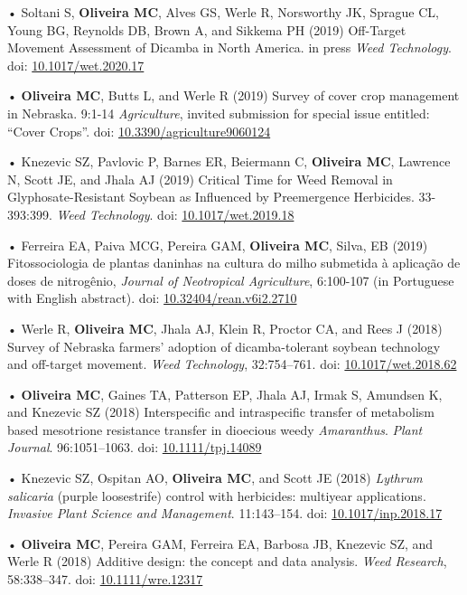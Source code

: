 \documentclass[11pt,]{article}
\begin{document}
• Soltani S, \textbf{Oliveira MC}, Alves GS, Werle R, Norsworthy JK,
Sprague CL, Young BG, Reynolds DB, Brown A, and Sikkema PH (2019)
Off-Target Movement Assessment of Dicamba in North America. in press
\emph{Weed Technology}. doi:
\href{https://doi.org/10.1017/wet.2020.17}{10.1017/wet.2020.17}

• \textbf{Oliveira MC}, Butts L, and Werle R (2019) Survey of cover crop
management in Nebraska. 9:1-14 \emph{Agriculture}, invited submission
for special issue entitled: ``Cover Crops''. doi:
\href{https://doi.org/10.3390/agriculture9060124}{10.3390/agriculture9060124}

• Knezevic SZ, Pavlovic P, Barnes ER, Beiermann C, \textbf{Oliveira MC},
Lawrence N, Scott JE, and Jhala AJ (2019) Critical Time for Weed Removal
in Glyphosate-Resistant Soybean as Influenced by Preemergence
Herbicides. 33-393:399. \emph{Weed Technology}. doi:
\href{https://doi.org/10.1017/wet.2019.18}{10.1017/wet.2019.18}

• Ferreira EA, Paiva MCG, Pereira GAM, \textbf{Oliveira MC}, Silva, EB
(2019) Fitossociologia de plantas daninhas na cultura do milho submetida
à aplicação de doses de nitrogênio, \emph{Journal of Neotropical
Agriculture}, 6:100-107 (in Portuguese with English abstract). doi:
\href{https://doi.org/10.32404/rean.v6i2.2710}{10.32404/rean.v6i2.2710}

• Werle R, \textbf{Oliveira MC}, Jhala AJ, Klein R, Proctor CA, and Rees
J (2018) Survey of Nebraska farmers' adoption of dicamba-tolerant
soybean technology and off-target movement. \emph{Weed Technology},
32:754--761. doi:
\href{https://doi.org/10.1017/wet.2018.62}{10.1017/wet.2018.62}

• \textbf{Oliveira MC}, Gaines TA, Patterson EP, Jhala AJ, Irmak S,
Amundsen K, and Knezevic SZ (2018) Interspecific and intraspecific
transfer of metabolism based mesotrione resistance transfer in dioecious
weedy \emph{Amaranthus}. \emph{Plant Journal}. 96:1051--1063. doi:
\href{https://onlinelibrary.wiley.com/doi/full/10.1111/tpj.14089}{10.1111/tpj.14089}

• Knezevic SZ, Ospitan AO, \textbf{Oliveira MC}, and Scott JE (2018)
\emph{Lythrum salicaria} (purple loosestrife) control with herbicides:
multiyear applications. \emph{Invasive Plant Science and Management}.
11:143--154. doi:
\href{https://doi.org/10.1017/inp.2018.17}{10.1017/inp.2018.17}

• \textbf{Oliveira MC}, Pereira GAM, Ferreira EA, Barbosa JB, Knezevic
SZ, and Werle R (2018) Additive design: the concept and data analysis.
\emph{Weed Research}, 58:338--347. doi:
\href{https://onlinelibrary.wiley.com/doi/full/10.1111/wre.12317}{10.1111/wre.12317}
\end{document}
